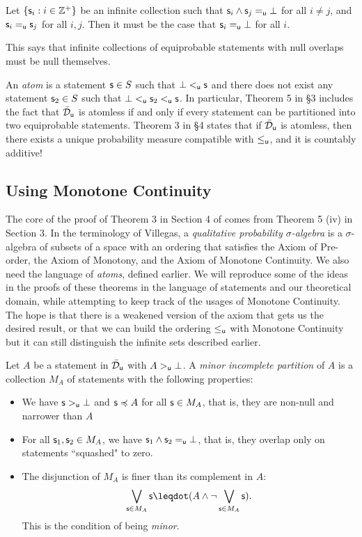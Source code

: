 \documentclass{article}
\begin{document}
\begin{prop}
\label{infinitenull}
Let $\{\stmt_i : i\in \mathbb{Z}^+\}$ be an infinite collection such that $\stmt_i\AND\stmt_j =_{\stmt[u]} \impossibility$ for all $i\neq j$, and $\stmt_i =_{\stmt[u]} \stmt_j$ for all $i,j$. Then it must be the case that $\stmt_i=_{\stmt[u]}\impossibility$ for all $i$. 
\end{prop}
This says that infinite collections of equiprobable statements with null overlaps must be null themselves. 

An \emph{atom} is a statement $\stmt\in S$ such that $\impossibility<_{\stmt[u]}\stmt$ and there does not exist any statement $\stmt_2\in S$ such that $\impossibility<_{\stmt[u]} \stmt_2<_{\stmt[u]} \stmt$. In particular, Theorem 5 in \cite{villegas} \S3 includes the fact that $\tdomain_{\stmt[u]}$ is atomless if and only if every statement can be partitioned into two equiprobable statements. Theorem 3 in \S4 states that if $\tdomain_{\stmt[u]}$ is atomless, then there exists a unique probability measure compatible with $\leq_{\stmt[u]}$, and it is countably additive!

\subsection{Using Monotone Continuity}

The core of the proof of Theorem 3 in Section 4 of \cite{villegas} comes from Theorem 5 (iv) in Section 3. In the terminology of Villegas, a \emph{qualitative probability $\sigma$-algebra} is a $\sigma$-algebra of subsets of a space with an ordering that satisfies the Axiom of Pre-order, the Axiom of Monotony, and the Axiom of Monotone Continuity. We also need the language of \emph{atoms}, defined earlier. We will reproduce some of the ideas in the proofs of these theorems in the language of statements and our theoretical domain, while attempting to keep track of the usages of Monotone Continuity. The hope is that there is a weakened version of the axiom that gets us the desired result, or that we can build the ordering $\leq_{\stmt[u]}$ with Monotone Continuity but it can still distinguish the infinite sets described earlier. 

Let $A$ be a statement in $\tdomain_{\stmt[u]}$ with $A>_{\stmt[u]} \impossibility$. A \emph{minor incomplete partition} of $A$ is a collection $M_A$ of statements with the following properties:
\begin{itemize}
    \item We have $\stmt>_{\stmt[u]}\impossibility$ and $\stmt \narrower A$ for all $\stmt\in M_A$, that is, they are non-null and narrower than $A$
    \item For all $\stmt_1,\stmt_2\in M_A$, we have $\stmt_1\AND\stmt_2 =_{\stmt[u]} \impossibility$, that is, they overlap only on statements ``squashed" to zero. 
    \item The disjunction of $M_A$ is finer than its complement in $A$: $$\bigOR_{\stmt\in M_A}\stmt \finer (A\AND \NOT\bigOR_{\stmt\in M_A}\stmt).$$ This is the condition of being \emph{minor}.
\end{itemize}
\end{document}
